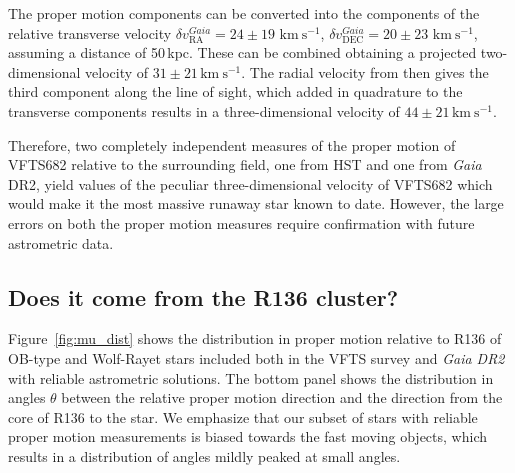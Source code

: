 \documentclass[apjl,twocolumn]{emulateapj}
\newcommand{\kms}{{\,\mathrm{km\ s^{-1}}}}
\DeclareRobustCommand{\Eqref}[1]{Eq.~\ref{#1}}
\begin{document}
The proper motion components can be converted into
the components of the relative transverse velocity $\delta v_\mathrm{RA}^{Gaia}=24\pm19\,\kms$,
$\delta v_\mathrm{DEC}^{Gaia}=20\pm23\,\kms$, assuming a distance of
50\,kpc. These can be combined obtaining a projected two-dimensional
velocity of $31\pm21\kms$. %
The radial velocity from
\cite{bestenlehner:11} then gives the third component along
the line of sight, %
which added in quadrature to the transverse components results in a
three-dimensional velocity of $44 \pm 21\kms$.

Therefore, two completely independent measures of the proper motion of
VFTS682 relative to the surrounding field, one from HST and one from
\emph{Gaia} DR2, yield values of the peculiar three-dimensional
velocity of VFTS682 %
which would make it the most massive runaway star
known to date. However, the large errors on both the proper motion measures
require confirmation with future astrometric data. 

\subsection{Does it come from the R136 cluster?}
\label{sec:r136_origin}


Figure~\ref{fig:mu_dist} shows the distribution in proper motion relative to R136
of OB-type and Wolf-Rayet stars included both in the VFTS survey and
\emph{Gaia DR2} with reliable astrometric solutions. The bottom panel
shows the distribution in angles $\theta$ between the relative proper motion
direction and the direction from the core of R136 to the star. We
emphasize that our subset of stars with reliable proper motion
measurements is biased towards the fast moving objects, which results in a
distribution of angles mildly peaked at small angles.
\end{document}
